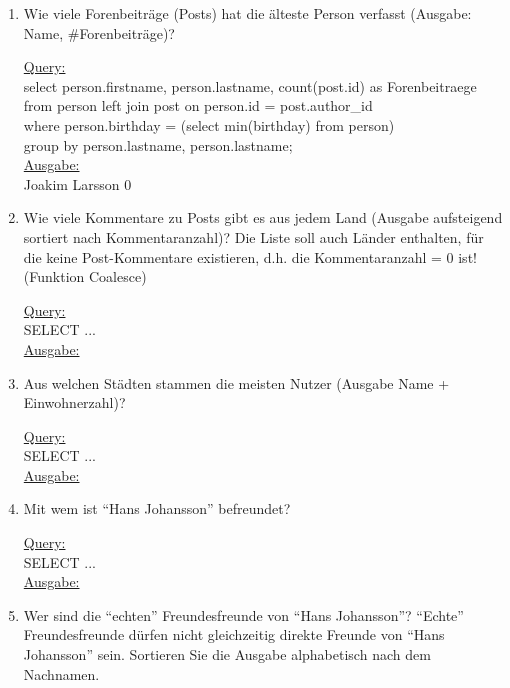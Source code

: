 \begin{enumerate}

    \item Wie viele Forenbeiträge (Posts) hat die älteste Person verfasst (Ausgabe: Name, \#Forenbeiträge)?

    \uline{Query:}\\
    select person.firstname, person.lastname, count(post.id) as Forenbeitraege \\
    from person left join post on person.id = post.author_id \\
    where person.birthday = (select min(birthday) from person) \\
    group by person.lastname, person.lastname; \\
    \uline{Ausgabe:}\\
    Joakim Larsson 0 \\

    \item Wie viele Kommentare zu Posts gibt es aus jedem Land (Ausgabe aufsteigend sortiert nach Kommentaranzahl)? Die Liste soll auch Länder enthalten, für die keine Post-Kommentare existieren, d.h. die Kommentaranzahl = 0 ist! (Funktion Coalesce)

    \uline{Query:}\\
    SELECT ...\\
    \uline{Ausgabe:}\\

    \item Aus welchen Städten stammen die meisten Nutzer (Ausgabe Name + Einwohnerzahl)?

    \uline{Query:}\\
    SELECT ...\\
    \uline{Ausgabe:}\\

    \item Mit wem ist \enquote{Hans Johansson} befreundet?

    \uline{Query:}\\
    SELECT ...\\
    \uline{Ausgabe:}\\

    \item Wer sind die \enquote{echten} Freundesfreunde von \enquote{Hans Johansson}? \enquote{Echte} Freundesfreunde dürfen nicht gleichzeitig direkte Freunde von \enquote{Hans Johansson} sein. Sortieren Sie die Ausgabe alphabetisch nach dem Nachnamen.


\end{enumerate}
